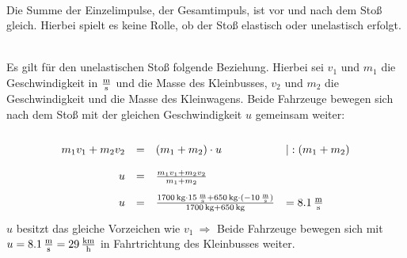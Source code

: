 \documentclass[a4paper]{article}
\begin{document}
\vspace{0.5 cm}


\\
Die Summe der Einzelimpulse, der Gesamtimpuls, ist vor und nach dem Stoß gleich. Hierbei spielt es keine Rolle, ob der Stoß elastisch oder unelastisch erfolgt.
\vspace{0.5 cm}

\\
Es gilt für den unelastischen Stoß folgende Beziehung. Hierbei sei $v_1$ und $m_1$ die Geschwindigkeit in $\SI{}{\meter\over\second}$ und die Masse des Kleinbusses, $v_2$ und $m_2$ die Geschwindigkeit und die Masse des Kleinwagens. Beide Fahrzeuge bewegen sich nach dem Stoß mit der gleichen Geschwindigkeit $u$ gemeinsam weiter:

$$
\renewcommand{\arraystretch}{2}
\begin{array}{rcll}
m_1 v_1 + m_2 v_2 &=&(m_1 + m_2)\cdot u &|:(m_1 + m_2) \\
u &=& {m_1 v_1 + m_2 v_2 \over  m_1 + m_2} \\
u &=& {\SI{1700}{\kilogram} \cdot  \SI{15}{\meter\over\second} + \SI{650}{\kilogram} \cdot (\SI{-10}{\meter\over\second})\over \SI{1700}{\kilogram} +  \SI{650}{\kilogram}} & = \SI{8,1}{\meter\over\second}
\end{array}
$$ 
$u$ besitzt das gleiche Vorzeichen wie $v_1~\Rightarrow$ Beide Fahrzeuge bewegen sich mit $u=\SI{8,1}{\meter\over\second} = \SI{29}{\kilo\meter\over\hour}$ in Fahrtrichtung des Kleinbusses weiter.
\vspace{0.5 cm}
\end{document}
